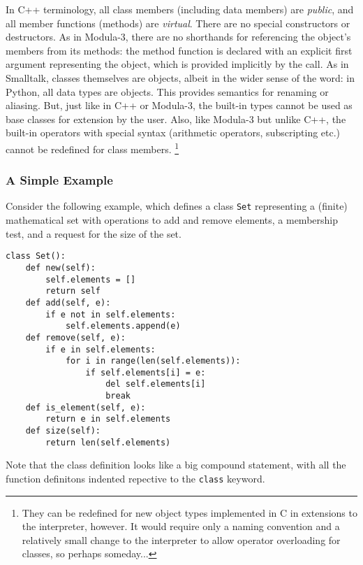 In C++ terminology, all class members (including data members) are
{\em public},
and all member functions (methods) are
{\em virtual}.
There are no special constructors or destructors.
As in Modula-3, there are no shorthands for referencing the object's
members from its methods: the method function is declared with an
explicit first argument representing the object, which is provided
implicitly by the call.
As in Smalltalk, classes themselves are objects, albeit in the wider
sense of the word: in Python, all data types are objects.
This provides semantics for renaming or aliasing.
But, just like in C++ or Modula-3, the built-in types cannot be used as
base classes for extension by the user.
Also, like Modula-3 but unlike C++, the built-in operators with special
syntax (arithmetic operators, subscripting etc.) cannot be redefined for
class members.%
\footnote{
	They can be redefined for new object types implemented in C in
	extensions to the interpreter, however.  It would require only a
	naming convention and a relatively small change to the
	interpreter to allow operator overloading for classes, so
	perhaps someday...
}

\subsubsection{A Simple Example}

Consider the following example, which defines a class {\tt Set}
representing a (finite) mathematical set with operations to add and
remove elements, a membership test, and a request for the size of the
set.
\bcode\begin{verbatim}
class Set():
    def new(self):
        self.elements = []
        return self
    def add(self, e):
        if e not in self.elements:
            self.elements.append(e)
    def remove(self, e):
        if e in self.elements:
            for i in range(len(self.elements)):
                if self.elements[i] = e:
                    del self.elements[i]
                    break
    def is_element(self, e):
        return e in self.elements
    def size(self):
        return len(self.elements)
\end{verbatim}\ecode
Note that the class definition looks like a big compound statement,
with all the function definitons indented repective to the
{\tt class}
keyword.

